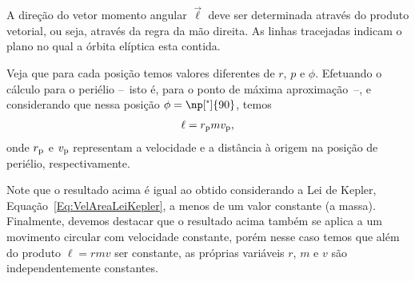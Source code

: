 \begin{marginfigure}
\centering
{}
\caption{A direção do vetor momento angular $\vec{\ell}$ deve ser determinada através do produto vetorial, ou seja, através da regra da mão direita. As linhas tracejadas indicam o plano no qual a órbita elíptica esta contida.}
\end{marginfigure}

Veja que para cada posição temos valores diferentes de $r$, $p$ e $\phi$. Efetuando o cálculo para o periélio --~isto é, para o ponto de máxima aproximação~--, e considerando que nessa posição $\phi = \np[\tcdegree]{90}$, temos
\begin{align}
    \ell = r_{\rm{p}} m v_{\rm{p}},
\end{align}
%
onde $r_{\rm{p}}$ e $v_{\rm{p}}$ representam a velocidade e a distância à origem na posição de periélio, respectivamente.

Note que o resultado acima é igual ao obtido considerando a Lei de Kepler, Equação~\eqref{Eq:VelAreaLeiKepler}, a menos de um valor constante (a massa). Finalmente, devemos destacar que o resultado acima também se aplica a um movimento circular com velocidade constante, porém nesse caso temos que além do produto $\ell = r m v$ ser constante, as próprias variáveis $r$, $m$ e $v$ são independentemente constantes.

